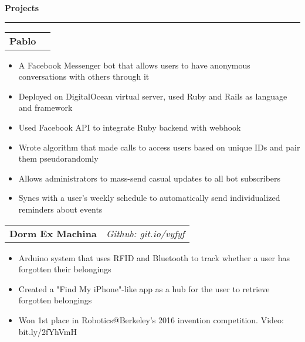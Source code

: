 \documentclass[11pt,letterpaper]{article}
\makeatletter
\newenvironment{topic}[1]
    {
    {\Large \centerline{#1}}
    \vspace*{0.03in}
    \hrule 
    \vspace*{0.05in}
    }
    {}
\newenvironment{event}
    {
    \begin{tabular*}{\textwidth}{l@{\extracolsep{\fill}}r}
    }
    {
    \end{tabular*}
    }
\makeatother
\begin{document}
\begin{topic}{\textbf{Projects}}
        \begin{event}
        \textbf{Pablo}
        \end{event}
            \begin{itemize}
                \item A Facebook Messenger bot that allows users to have anonymous conversations with others through it
                \item Deployed on DigitalOcean virtual server, used Ruby and Rails as language and framework
                \item Used Facebook API to integrate Ruby backend with webhook 
                \item Wrote algorithm that made calls to access users based on unique IDs and pair them pseudorandomly
                \item Allows administrators to mass-send casual updates to all bot subscribers
                \item Syncs with a user's weekly schedule to automatically send individualized reminders about events
            \end{itemize}


        \begin{event}
            \textbf{Dorm Ex Machina} & \emph{Github: git.io/vyfyf}
        \end{event}
            \begin{itemize}
                \item Arduino system that uses RFID and Bluetooth to track whether a user has forgotten their belongings
                \item Created a "Find My iPhone"-like app as a hub for the user to retrieve forgotten belongings
                \item Won 1st place in Robotics@Berkeley's 2016 invention competition. Video: bit.ly/2fYhVmH
            \end{itemize}
        
    \end{topic} \vspace*{0.1in}
\end{document}
